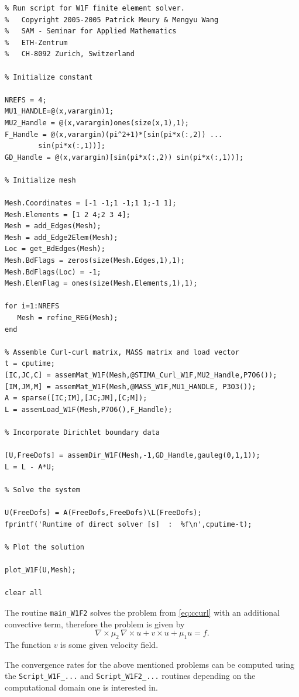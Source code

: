 \begin{lstlisting}
% Run script for W1F finite element solver.
%   Copyright 2005-2005 Patrick Meury & Mengyu Wang
%   SAM - Seminar for Applied Mathematics
%   ETH-Zentrum
%   CH-8092 Zurich, Switzerland

% Initialize constant
    
NREFS = 4;
MU1_HANDLE=@(x,varargin)1;
MU2_Handle = @(x,varargin)ones(size(x,1),1);
F_Handle = @(x,varargin)(pi^2+1)*[sin(pi*x(:,2)) ...
		sin(pi*x(:,1))];
GD_Handle = @(x,varargin)[sin(pi*x(:,2)) sin(pi*x(:,1))];

% Initialize mesh
    
Mesh.Coordinates = [-1 -1;1 -1;1 1;-1 1];
Mesh.Elements = [1 2 4;2 3 4];
Mesh = add_Edges(Mesh);
Mesh = add_Edge2Elem(Mesh);
Loc = get_BdEdges(Mesh);
Mesh.BdFlags = zeros(size(Mesh.Edges,1),1);
Mesh.BdFlags(Loc) = -1;
Mesh.ElemFlag = ones(size(Mesh.Elements,1),1);
    
for i=1:NREFS
   Mesh = refine_REG(Mesh);
end
    
% Assemble Curl-curl matrix, MASS matrix and load vector
t = cputime;
[IC,JC,C] = assemMat_W1F(Mesh,@STIMA_Curl_W1F,MU2_Handle,P7O6());
[IM,JM,M] = assemMat_W1F(Mesh,@MASS_W1F,MU1_HANDLE, P3O3());
A = sparse([IC;IM],[JC;JM],[C;M]);
L = assemLoad_W1F(Mesh,P7O6(),F_Handle);
    
% Incorporate Dirichlet boundary data
  
[U,FreeDofs] = assemDir_W1F(Mesh,-1,GD_Handle,gauleg(0,1,1));
L = L - A*U;
    
% Solve the system
    
U(FreeDofs) = A(FreeDofs,FreeDofs)\L(FreeDofs);
fprintf('Runtime of direct solver [s]  :  %f\n',cputime-t);

% Plot the solution

plot_W1F(U,Mesh);

clear all
\end{lstlisting}

The routine \texttt{main\_W1F2} solves the problem from \eqref{eq:ccurl} with an additional convective term, therefore the problem is given by
\begin{equation}
 \nabla \times \mu_2 \, \nabla \times u + v \times u + \mu_1 u = f.
\end{equation}
The function $v$ is some given velocity field.

The convergence rates for the above mentioned problems can be computed using the \texttt{Script\_W1F\_...} and \texttt{Script\_W1F2\_...} routines depending on the computational domain one is interested in.



